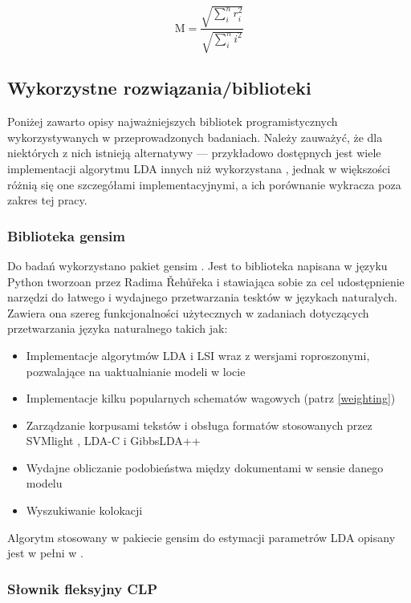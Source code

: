 \documentclass[11pt,a4paper]{article}
\begin{document}
\begin{equation}
  \label{eq:rating}
  \mathrm{M} = \frac{\sqrt{\sum_i^n r_i^2}}{\sqrt{\sum_i^n i^2}}
\end{equation}

\subsection{Wykorzystne rozwiązania/biblioteki}

Poniżej zawarto opisy najważniejszych bibliotek programistycznych
wykorzystywanych w przeprowadzonych badaniach. Należy zauważyć, że dla
niektórych z nich istnieją alternatywy --- przykładowo dostępnych jest wiele
implementacji algorytmu LDA innych niż wykorzystana
\cite{svmlight,lda-c,gibbs-lda}, jednak w większości różnią się one szczegółami
implementacyjnymi, a ich porównanie wykracza poza zakres tej pracy.

\subsubsection{Biblioteka gensim}
Do badań wykorzystano pakiet gensim \cite{gensim}. Jest to biblioteka napisana
w języku Python tworzoan przez Radima Řehůřeka i stawiająca sobie za cel
udostępnienie narzędzi do łatwego i wydajnego przetwarzania tesktów w językach
naturalych. Zawiera ona szereg funkcjonalności użytecznych w zadaniach
dotyczących przetwarzania języka naturalnego takich jak:

\begin{itemize}
\item Implementacje algorytmów LDA i LSI wraz z wersjami roproszonymi, pozwalające na uaktualnianie modeli w locie
\item Implementacje kilku popularnych schematów wagowych (patrz \ref{weighting})
\item Zarządzanie korpusami tekstów i obsługa formatów stosowanych przez SVMlight \cite{svmlight},
LDA-C \cite{lda-c} i GibbsLDA++ \cite{gibbs-lda}
\item Wydajne obliczanie podobieństwa między dokumentami w sensie danego modelu
\item Wyszukiwanie kolokacji
\end{itemize}

Algorytm stosowany w pakiecie gensim do estymacji parametrów LDA opisany jest
w pełni w \cite{gensim-algorithm}.

\subsubsection{Słownik fleksyjny CLP}
\label{sec:clp}
\end{document}
